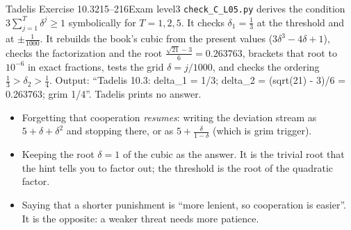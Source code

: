 \begin{exsol}{Tadelis Exercise 10.3}{215--216}{Exam level}{3}
\verify \texttt{check\_C\_L05.py} derives the condition $3\sum_{j=1}^T\delta^j \ge 1$ symbolically
for $T = 1, 2, 5$. It checks $\delta_1 = \frac13$ at the threshold and at $\pm\frac1{1000}$. It
rebuilds the book's cubic from the present values ($3\delta^3 - 4\delta + 1$), checks the
factorization and the root $\frac{\sqrt{21}-3}{6} = 0.263763$, brackets that root to $10^{-6}$ in exact
fractions, tests the grid $\delta = j/1000$, and checks the ordering $\frac13 > \delta_2 > \frac14$. Output:
``Tadelis 10.3: delta\_1 = 1/3; delta\_2 = (sqrt(21) - 3)/6 = 0.263763; grim 1/4''. Tadelis prints
no answer.

\mistakes
\begin{itemize}
  \item Forgetting that cooperation \emph{resumes}: writing the deviation stream as $5 + \delta + \delta^2$
  and stopping there, or as $5 + \frac{\delta}{1-\delta}$ (which is grim trigger).
  \item Keeping the root $\delta = 1$ of the cubic as the answer. It is the trivial root that the
  hint tells you to factor out; the threshold is the root of the quadratic factor.
  \item Saying that a shorter punishment is ``more lenient, so cooperation is easier''. It is the
  opposite: a weaker threat needs more patience.
\end{itemize}

\end{exsol}

